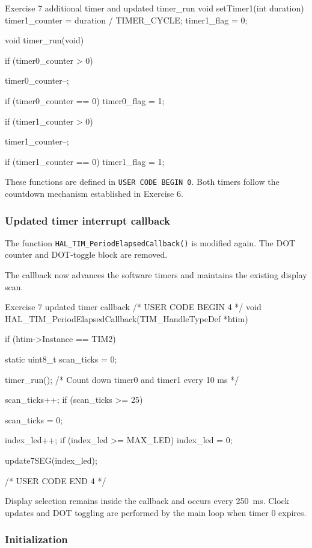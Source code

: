 \documentclass[a4paper]{article}
\begin{document}
\begin{stmcode}{Exercise 7 additional timer and updated timer_run}
void setTimer1(int duration)
{
    timer1_counter = duration / TIMER_CYCLE;
    timer1_flag = 0;
}

void timer_run(void)
{
    if (timer0_counter > 0)
    {
        timer0_counter--;

        if (timer0_counter == 0)
        {
            timer0_flag = 1;
        }
    }

    if (timer1_counter > 0)
    {
        timer1_counter--;

        if (timer1_counter == 0)
        {
            timer1_flag = 1;
        }
    }
}
\end{stmcode}

These functions are defined in
\texttt{USER CODE BEGIN 0}.
Both timers follow the countdown mechanism
established in Exercise 6.

\subsubsection{Updated timer interrupt callback}

The function
\texttt{HAL\_TIM\_PeriodElapsedCallback()}
is modified again. The DOT counter and
DOT-toggle block are removed.

The callback now advances the software timers
and maintains the existing display scan.

\begin{stmcode}{Exercise 7 updated timer callback}
/* USER CODE BEGIN 4 */
void HAL_TIM_PeriodElapsedCallback(TIM_HandleTypeDef *htim)
{
    if (htim->Instance == TIM2)
    {
        static uint8_t scan_ticks = 0;

        timer_run();    /* Count down timer0 and timer1 every 10 ms */

        scan_ticks++;
        if (scan_ticks >= 25)
        {
            scan_ticks = 0;

            index_led++;
            if (index_led >= MAX_LED)
            {
                index_led = 0;
            }

            update7SEG(index_led);
        }
    }
}
/* USER CODE END 4 */
\end{stmcode}

Display selection remains inside the callback
and occurs every 250~ms.
Clock updates and DOT toggling are performed
by the main loop when timer 0 expires.

\subsubsection{Initialization}
\end{document}
